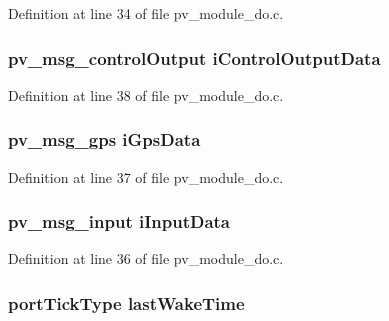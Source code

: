 Definition at line 34 of file pv\+\_\+module\+\_\+do.\+c.

\subsubsection[{\texorpdfstring{i\+Control\+Output\+Data}{iControlOutputData}}]{\setlength{\rightskip}{0pt plus 5cm}pv\+\_\+msg\+\_\+control\+Output i\+Control\+Output\+Data}\hypertarget{group__app__do_gacabca53fbaffdbf13b8e5a1c29b73bc4}{}\label{group__app__do_gacabca53fbaffdbf13b8e5a1c29b73bc4}


Definition at line 38 of file pv\+\_\+module\+\_\+do.\+c.

\subsubsection[{\texorpdfstring{i\+Gps\+Data}{iGpsData}}]{\setlength{\rightskip}{0pt plus 5cm}pv\+\_\+msg\+\_\+gps i\+Gps\+Data}\hypertarget{group__app__do_gac433f205128f94bd944f8ddcbff92744}{}\label{group__app__do_gac433f205128f94bd944f8ddcbff92744}


Definition at line 37 of file pv\+\_\+module\+\_\+do.\+c.

\subsubsection[{\texorpdfstring{i\+Input\+Data}{iInputData}}]{\setlength{\rightskip}{0pt plus 5cm}pv\+\_\+msg\+\_\+input i\+Input\+Data}\hypertarget{group__app__do_gac40b8cfe5fd2000670ad57fe3e75ec89}{}\label{group__app__do_gac40b8cfe5fd2000670ad57fe3e75ec89}


Definition at line 36 of file pv\+\_\+module\+\_\+do.\+c.

\subsubsection[{\texorpdfstring{last\+Wake\+Time}{lastWakeTime}}]{\setlength{\rightskip}{0pt plus 5cm}port\+Tick\+Type last\+Wake\+Time}\hypertarget{group__app__do_gaa8db3871cb5f64abbd94ddd5a1db73a6}{}\label{group__app__do_gaa8db3871cb5f64abbd94ddd5a1db73a6}



